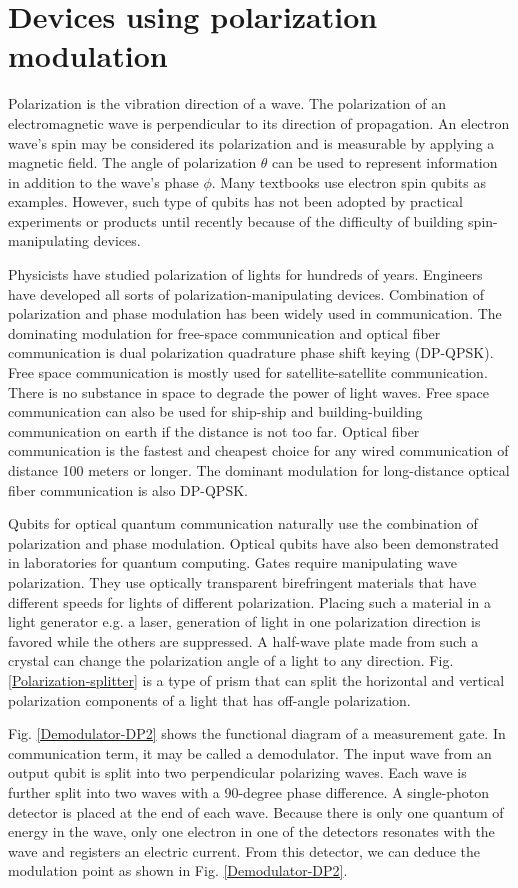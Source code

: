 \documentclass[oneside, letter, 12pt]{book}
\begin{document}
\section{Devices using polarization modulation}
Polarization is the vibration direction of a wave. The polarization of an electromagnetic wave is perpendicular to its direction of propagation. An electron wave's spin may be considered its polarization and is measurable by applying a magnetic field. The angle of polarization $\theta$ can be used to represent information in addition to the wave's phase $\phi$. Many textbooks use electron spin qubits as examples. However, such type of qubits has not been adopted by practical experiments or products until recently\cite{nanotube} because of the difficulty of building spin-manipulating devices.

Physicists have studied polarization of lights for hundreds of years. Engineers have developed all sorts of polarization-manipulating devices. Combination of polarization and phase modulation has been widely used in communication. The dominating modulation for free-space communication and optical fiber communication is dual polarization quadrature phase shift keying (DP-QPSK). Free space communication is mostly used for satellite-satellite communication. There is no substance in space to degrade the power of light waves. Free space communication can also be used for ship-ship and building-building communication on earth if the distance is not too far. Optical fiber communication is the fastest and cheapest choice for any wired communication of distance 100 meters or longer. The dominant modulation for long-distance optical fiber communication is also DP-QPSK.

Qubits for optical quantum communication naturally use the combination of polarization and phase modulation. Optical qubits have also been demonstrated in laboratories for quantum computing. Gates require manipulating wave polarization. They use optically transparent birefringent materials that have different speeds for lights of different polarization. Placing such a material in a light generator e.g. a laser, generation of light in one polarization direction is favored while the others are suppressed. A half-wave plate made from such a crystal can change the polarization angle of a light to any direction. Fig. \ref{Polarization-splitter} is a type of prism that can split the horizontal and vertical polarization components of a light that has off-angle polarization.

Fig. \ref{Demodulator-DP2} shows the functional diagram of a measurement gate. In communication term, it may be called a demodulator. The input wave from an output qubit is split into two perpendicular polarizing waves. Each wave is further split into two waves with a 90-degree phase difference. A single-photon detector is placed at the end of each wave. Because there is only one quantum of energy in the wave, only one electron in one of the detectors resonates with the wave and registers an electric current. From this detector, we can deduce the modulation point as shown in Fig. \ref{Demodulator-DP2}.
\end{document}
